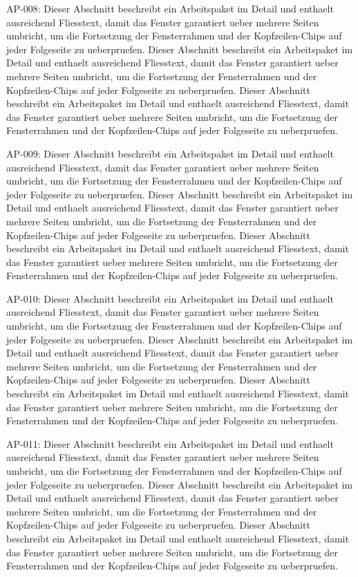 \documentclass[type=report,theme=dark,language=de]{semio}
\begin{document}
\begin{Table}[title=Lange Tabelle]
AP-008: Dieser Abschnitt beschreibt ein Arbeitspaket im Detail und enthaelt ausreichend Fliesstext, damit das Fenster garantiert ueber mehrere Seiten umbricht, um die Fortsetzung der Fensterrahmen und der Kopfzeilen-Chips auf jeder Folgeseite zu ueberpruefen. Dieser Abschnitt beschreibt ein Arbeitspaket im Detail und enthaelt ausreichend Fliesstext, damit das Fenster garantiert ueber mehrere Seiten umbricht, um die Fortsetzung der Fensterrahmen und der Kopfzeilen-Chips auf jeder Folgeseite zu ueberpruefen. Dieser Abschnitt beschreibt ein Arbeitspaket im Detail und enthaelt ausreichend Fliesstext, damit das Fenster garantiert ueber mehrere Seiten umbricht, um die Fortsetzung der Fensterrahmen und der Kopfzeilen-Chips auf jeder Folgeseite zu ueberpruefen. 

AP-009: Dieser Abschnitt beschreibt ein Arbeitspaket im Detail und enthaelt ausreichend Fliesstext, damit das Fenster garantiert ueber mehrere Seiten umbricht, um die Fortsetzung der Fensterrahmen und der Kopfzeilen-Chips auf jeder Folgeseite zu ueberpruefen. Dieser Abschnitt beschreibt ein Arbeitspaket im Detail und enthaelt ausreichend Fliesstext, damit das Fenster garantiert ueber mehrere Seiten umbricht, um die Fortsetzung der Fensterrahmen und der Kopfzeilen-Chips auf jeder Folgeseite zu ueberpruefen. Dieser Abschnitt beschreibt ein Arbeitspaket im Detail und enthaelt ausreichend Fliesstext, damit das Fenster garantiert ueber mehrere Seiten umbricht, um die Fortsetzung der Fensterrahmen und der Kopfzeilen-Chips auf jeder Folgeseite zu ueberpruefen. 

AP-010: Dieser Abschnitt beschreibt ein Arbeitspaket im Detail und enthaelt ausreichend Fliesstext, damit das Fenster garantiert ueber mehrere Seiten umbricht, um die Fortsetzung der Fensterrahmen und der Kopfzeilen-Chips auf jeder Folgeseite zu ueberpruefen. Dieser Abschnitt beschreibt ein Arbeitspaket im Detail und enthaelt ausreichend Fliesstext, damit das Fenster garantiert ueber mehrere Seiten umbricht, um die Fortsetzung der Fensterrahmen und der Kopfzeilen-Chips auf jeder Folgeseite zu ueberpruefen. Dieser Abschnitt beschreibt ein Arbeitspaket im Detail und enthaelt ausreichend Fliesstext, damit das Fenster garantiert ueber mehrere Seiten umbricht, um die Fortsetzung der Fensterrahmen und der Kopfzeilen-Chips auf jeder Folgeseite zu ueberpruefen. 

AP-011: Dieser Abschnitt beschreibt ein Arbeitspaket im Detail und enthaelt ausreichend Fliesstext, damit das Fenster garantiert ueber mehrere Seiten umbricht, um die Fortsetzung der Fensterrahmen und der Kopfzeilen-Chips auf jeder Folgeseite zu ueberpruefen. Dieser Abschnitt beschreibt ein Arbeitspaket im Detail und enthaelt ausreichend Fliesstext, damit das Fenster garantiert ueber mehrere Seiten umbricht, um die Fortsetzung der Fensterrahmen und der Kopfzeilen-Chips auf jeder Folgeseite zu ueberpruefen. Dieser Abschnitt beschreibt ein Arbeitspaket im Detail und enthaelt ausreichend Fliesstext, damit das Fenster garantiert ueber mehrere Seiten umbricht, um die Fortsetzung der Fensterrahmen und der Kopfzeilen-Chips auf jeder Folgeseite zu ueberpruefen. 


\end{Table}
\end{document}
